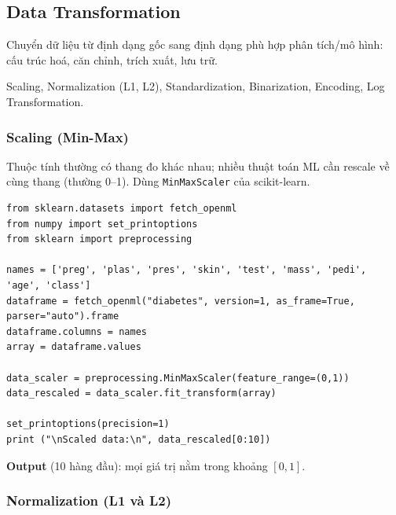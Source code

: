 \subsection{Data Transformation}

\begin{ynghia}[title={Biến đổi dữ liệu}]
Chuyển dữ liệu từ định dạng gốc sang định dạng phù hợp phân tích/mô hình: cấu trúc hoá, căn chỉnh, trích xuất, lưu trữ.
\end{ynghia}

\begin{phuongphap}[title={Kỹ thuật biến đổi phổ biến}]
Scaling, Normalization (L1, L2), Standardization, Binarization, Encoding, Log Transformation.
\end{phuongphap}

\subsubsection{Scaling (Min-Max)}

\begin{ynghia}[title={Rescaling}]
Thuộc tính thường có thang đo khác nhau; nhiều thuật toán ML cần rescale về cùng thang (thường 0--1).
Dùng \texttt{MinMaxScaler} của scikit-learn.
\end{ynghia}

\begin{vidu}[title={MinMaxScaler trên Pima Indians Diabetes}]
\begin{lstlisting}
from sklearn.datasets import fetch_openml
from numpy import set_printoptions
from sklearn import preprocessing

names = ['preg', 'plas', 'pres', 'skin', 'test', 'mass', 'pedi', 'age', 'class']
dataframe = fetch_openml("diabetes", version=1, as_frame=True, parser="auto").frame
dataframe.columns = names
array = dataframe.values

data_scaler = preprocessing.MinMaxScaler(feature_range=(0,1))
data_rescaled = data_scaler.fit_transform(array)

set_printoptions(precision=1)
print ("\nScaled data:\n", data_rescaled[0:10])
\end{lstlisting}
\textbf{Output} (10 hàng đầu): mọi giá trị nằm trong khoảng $[0,1]$.
\end{vidu}

\subsubsection{Normalization (L1 và L2)}


